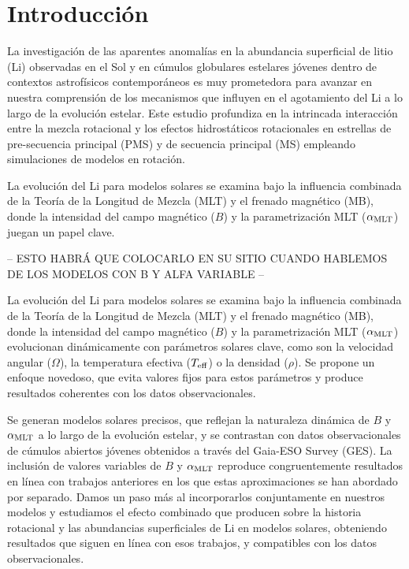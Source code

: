 %


\chapter{Introducción}

La investigación de las aparentes anomalías en la abundancia superficial de litio (Li) observadas en el Sol y en cúmulos globulares estelares jóvenes dentro de contextos astrofísicos contemporáneos es muy prometedora para avanzar en nuestra comprensión de los mecanismos que influyen en el agotamiento del Li a lo largo de la evolución estelar. Este estudio profundiza en la intrincada interacción entre la mezcla rotacional y los efectos hidrostáticos rotacionales en estrellas de pre-secuencia principal (PMS) y de secuencia principal (MS) empleando simulaciones de modelos en rotación.\par 

La evolución del Li para modelos solares se examina bajo la influencia combinada de la Teoría de la Longitud de Mezcla (MLT) y el frenado magnético (MB), donde la intensidad del campo magnético ($B$) y la parametrización MLT ($\alpha_{\mathrm{MLT}}$) juegan un papel clave.


-- ESTO HABRÁ QUE COLOCARLO EN SU SITIO CUANDO HABLEMOS DE LOS MODELOS CON B Y ALFA VARIABLE --


La evolución del Li para modelos solares se examina bajo la influencia combinada de la Teoría de la Longitud de Mezcla (MLT) y el frenado magnético (MB), donde la intensidad del campo magnético ($B$) y la parametrización MLT ($\alpha_{\mathrm{MLT}}$) evolucionan dinámicamente con parámetros solares clave, como son la velocidad angular ($\Omega$), la temperatura efectiva ($T_{\mathrm{eff}}$) o la densidad ($\rho$). Se propone un enfoque novedoso, que evita valores fijos para estos parámetros y produce resultados coherentes con los datos observacionales.\par

Se generan modelos solares precisos, que reflejan la naturaleza dinámica de $B$ y $\alpha_{\mathrm{MLT}}$ a lo largo de la evolución estelar, y se contrastan con datos observacionales de cúmulos abiertos jóvenes obtenidos a través del Gaia-ESO Survey (GES). La inclusión de valores variables de $B$ y $\alpha_{\mathrm{MLT}}$ reproduce congruentemente resultados en línea con trabajos anteriores en los que estas aproximaciones se han abordado por separado. Damos un paso más al incorporarlos conjuntamente en nuestros modelos y estudiamos el efecto combinado que producen sobre la historia rotacional y las abundancias superficiales de Li en modelos solares, obteniendo resultados que siguen en línea con esos trabajos, y compatibles con los datos observacionales.\par

